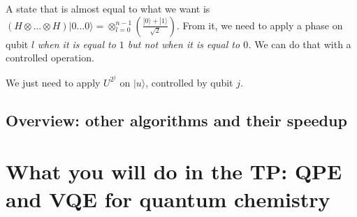 \documentclass{article}
\begin{document}
A state that is almost equal to what we want is $\left(H\otimes ... \otimes H\right) |0...0\rangle = \otimes_{l=0}^{n-1} \left(\frac{|0\rangle+|1\rangle}{\sqrt{2}}\right)$. From it, we need to apply a phase on qubit $l$ \emph{when it is equal to $1$ but not when it is equal to $0$.} We can do that with a controlled operation.

We just need to apply $U^{2^j}$ on $|u\rangle$, controlled by qubit $j$.

\subsection{Overview: other algorithms and their speedup}



\section{What you will do in the TP: QPE and VQE for quantum chemistry}
\end{document}
